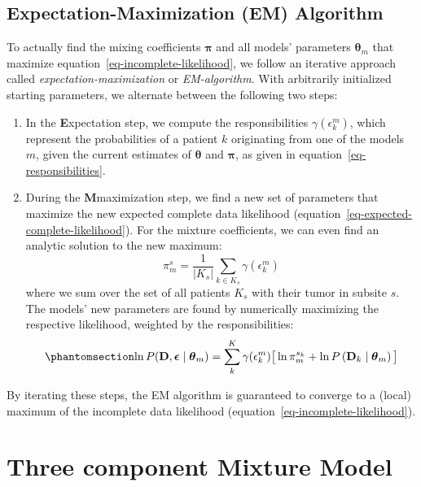 \documentclass[
  sn-mathphys-num,
]{sn-jnl}
\providecommand{\tightlist}{%
  \setlength{\itemsep}{0pt}\setlength{\parskip}{0pt}}\usepackage{longtable,booktabs,array}
\begin{document}
\subsection{Expectation-Maximization (EM)
Algorithm}\label{expectation-maximization-em-algorithm}

To actually find the mixing coefficients \(\boldsymbol{\pi}\) and all
models' parameters \(\boldsymbol{\theta}_m\) that maximize
equation~\ref{eq-incomplete-likelihood}, we follow an iterative approach
called \emph{expectation-maximization} or \emph{EM-algorithm}. With
arbitrarily initialized starting parameters, we alternate between the
following two steps:

\begin{enumerate}
\def\labelenumi{\arabic{enumi}.}
\tightlist
\item
  In the \textbf{E}xpectation step, we compute the responsibilities
  \(\gamma(\epsilon_k^m)\), which represent the probabilities of a
  patient \(k\) originating from one of the models \(m\), given the
  current estimates of \(\boldsymbol{\theta}\) and \(\boldsymbol{\pi}\),
  as given in equation~\ref{eq-responsibilities}.
\item
  During the \textbf{M}maximization step, we find a new set of
  parameters that maximize the new expected complete data likelihood
  (equation~\ref{eq-expected-complete-likelihood}). For the mixture
  coefficients, we can even find an analytic solution to the new
  maximum: \[
  \pi_m^s = \frac{1}{|K_s|} \sum_{k \in K_s} \gamma(\epsilon_k^m)
  \] where we sum over the set of all patients \(K_s\) with their tumor
  in subsite \(s\).\\
  The models' new parameters are found by numerically maximizing the
  respective likelihood, weighted by the responsibilities:
  \begin{equation}\phantomsection\label{eq-maximization-step}{
  \ln P(\mathbf{D}, \boldsymbol{\epsilon} \mid \boldsymbol{\theta}_m) = \sum_k^K \gamma(\epsilon^m_{k}) \big[ \ln \pi_m^{s_k} + \ln P \left( \mathbf{D}_k \mid \boldsymbol{\theta}_m \right) \big]
  }\end{equation}
\end{enumerate}

By iterating these steps, the EM algorithm is guaranteed to converge to
a (local) maximum of the incomplete data likelihood
(equation~\ref{eq-incomplete-likelihood}).

\section{Three component Mixture Model}\label{sec-3comp}
\end{document}
